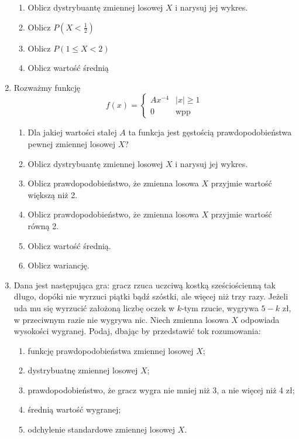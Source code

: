 \documentclass{mwart}
\newcommand{\ans}[1]{}
\newcommand{\ans}[1]{\emph{Odpowiedź:} #1}
\begin{document}
\begin{enumerate}
\begin{enumerate}
\item Oblicz dystrybuantę zmiennej losowej $X$ i narysuj jej wykres.
\item Oblicz $P(X<\frac{1}{2})$
\item Oblicz $P(1\leq X<2)$
\item Oblicz wartość średnią
\end{enumerate}
\item Rozważmy funkcję \[f(x)=\begin{cases} Ax^{-4} & \left|x\right|\geq 1 \\ 0 & \text{wpp} \end{cases} \]
\begin{enumerate}
\item Dla jakiej wartości stałej $A$ ta funkcja jest gęstością prawdopodobieństwa pewnej zmiennej losowej $X$? \ans{$\frac{3}{2}$}
\item Oblicz dystrybuantę zmiennej losowej $X$ i narysuj jej wykres. \ans{\[\begin{cases}-\frac{x^{-3}}{2} & x\leq-1\\\frac{1}{2} & -1<x\leq1\\1-\frac{x^{-3}}{2} & x>1 \end{cases}\]}
\item Oblicz prawdopodobieństwo, że zmienna losowa $X$ przyjmie wartość większą niż 2. \ans{$\frac{1}{16}$}
\item Oblicz prawdopodobieństwo, że zmienna losowa $X$ przyjmie wartość równą 2. \ans{$0$}
\item Oblicz wartość średnią. \ans{$0$}
\item Oblicz wariancję. \ans{$3$}
\end{enumerate}
\item Dana jest następująca gra: gracz rzuca uczciwą kostką sześciościenną tak długo, dopóki nie wyrzuci piątki bądź
szóstki, ale więcej niż trzy razy. Jeżeli uda mu się wyrzucić założoną liczbę oczek w $k$-tym rzucie, wygrywa $5-k$
zł, w przeciwnym razie nie wygrywa nic. Niech zmienna losowa $X$ odpowiada wysokości wygranej. Podaj, dbając
by przedstawić tok rozumowania:
\begin{enumerate}
\item funkcję prawdopodobieństwa zmiennej losowej $X$;
\item dystrybuatnę zmiennej losowej $X$;
\item prawdopodobieństwo, że gracz wygra nie mniej niż 3, a nie więcej niż 4 zł;
\item średnią wartość wygranej;
\item odchylenie standardowe zmiennej losowej $X$.

\end{enumerate}
\end{enumerate}
\end{document}
